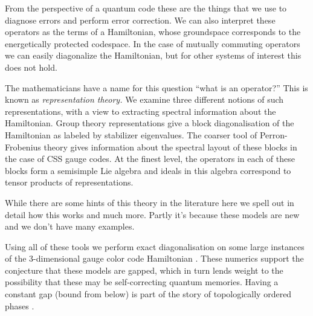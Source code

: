 From the perspective of a quantum code these are the
things that we use to diagnose errors and perform error correction.
We can also interpret these operators as the terms of a Hamiltonian, whose
groundspace corresponds to the energetically protected codespace.
In the case of mutually commuting operators we can easily diagonalize the
Hamiltonian, but for other systems of interest this does not hold.

The mathematicians have a name for this question ``what is an operator?''
This is known as \emph{representation theory.}
We examine three different notions of
such representations, with a view to extracting
spectral information about the Hamiltonian.
Group theory representations give 
a block diagonalisation of the Hamiltonian as labeled by stabilizer eigenvalues.
The coarser tool of Perron-Frobenius theory gives information about the
spectral layout of these blocks in the case of CSS gauge codes.
At the finest level, the operators in each of these blocks form a semisimple Lie
algebra and ideals in this algebra correspond to tensor products of
representations. 

While there are
some hints of this theory in the literature 
\cite{Bacon2006quantum,Yoshida2010} %
here we spell out in detail how this works and much more.
Partly it's because these models are new and we don't have
many examples.

Using all of these tools we 
perform exact diagonalisation on some 
large instances of the 3-dimensional gauge color code 
Hamiltonian \cite{Bombin2015,Bombin2015single,Kubica2015}.
These numerics support the conjecture that these models are gapped,
which in turn lends weight to the possibility that these may
be self-correcting quantum memories.
Having a constant gap (bound from below)
is part of the story of topologically ordered phases
\cite{Kitaev2003,Brown2016}.




